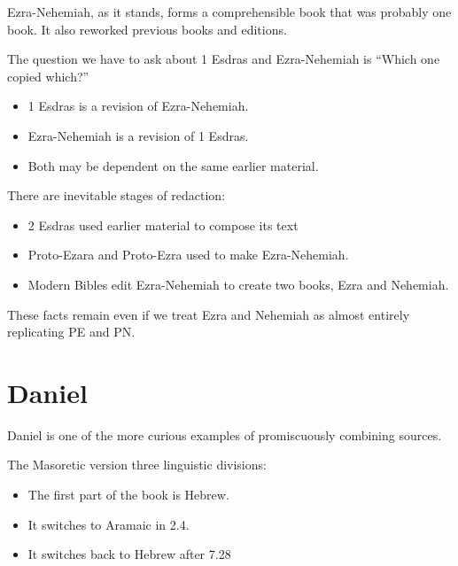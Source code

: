 \documentclass{beamer}
\begin{document}
\begin{frame}
  Ezra-Nehemiah, as it stands, forms a comprehensible book that was probably one book.
  It also reworked previous books and editions.
\end{frame}

\begin{frame}
  The question we have to ask about 1 Esdras and Ezra-Nehemiah is ``Which one copied which?''\pause
  \begin{itemize}
	\item 1 Esdras is a revision of Ezra-Nehemiah.\pause
	\item Ezra-Nehemiah is a revision of 1 Esdras.\pause
	\item Both may be dependent on the same earlier material.
  \end{itemize}
\end{frame}

\begin{frame}
  There are inevitable stages of redaction:\pause
  \begin{itemize}
	\item 2 Esdras used earlier material to compose its text\pause
	\item Proto-Ezara and Proto-Ezra used to make Ezra-Nehemiah.\pause
	\item Modern Bibles edit Ezra-Nehemiah to create two books, Ezra and Nehemiah.\pause
  \end{itemize}
  These facts remain even if we treat Ezra and Nehemiah as almost entirely replicating PE and PN.
\end{frame}

\section{Daniel}

\begin{frame}
  Daniel is one of the more curious examples of promiscuously combining sources.
\end{frame}

\begin{frame}
  The Masoretic version three linguistic divisions:\pause
  \begin{itemize}
	\item The first part of the book is Hebrew.\pause
	\item It switches to Aramaic in 2.4.\pause
	\item It switches back to Hebrew after 7.28
  \end{itemize}
\end{frame}
\end{document}
